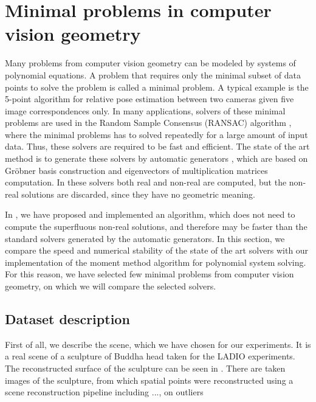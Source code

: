 \chapter{Minimal problems in computer vision geometry}
Many problems from computer vision geometry can be modeled by systems of polynomial equations.
A problem that requires only the minimal subset of data points to solve the problem is called a minimal problem.
A typical example is the 5-point algorithm \cite{5pt} for relative pose estimation between two cameras given five image correspondences only.
In many applications, solvers of these minimal problems are used in the Random Sample Consensus (RANSAC) algorithm \cite{ransac}, where the minimal problems has to solved repeatedly for a large amount of input data.
Thus, these solvers are required to be fast and efficient.
The state of the art method is to generate these solvers by automatic generators \cite{autogen}, which are based on Gr\"obner basis construction and eigenvectors of multiplication matrices computation.
In these solvers both real and non-real are computed, but the non-real solutions are discarded, since they have no geometric meaning.

In , we have proposed and implemented an algorithm, which does not need to compute the superfluous non-real solutions, and therefore may be faster than the standard solvers generated by the automatic generators.
In this section, we compare the speed and numerical stability of the state of the art solvers with our implementation of the moment method algorithm for polynomial system solving.
For this reason, we have selected few minimal problems from computer vision geometry, on which we will compare the selected solvers.

\section{Dataset description}

First of all, we describe the scene, which we have chosen for our experiments.
It is a real scene of a sculpture of Buddha head taken for the LADIO \cite{ladio} experiments.
The reconstructed surface of the sculpture can be seen in .
There are \importAppLADIONumCameras{} taken images of the sculpture, from which \importAppLADIONumPoints{} spatial points were reconstructed using a scene reconstruction pipeline including ..., on outliers

